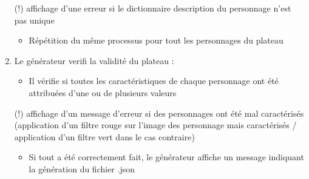 \documentclass[a4paper]{article}
\begin{document}
\begin{enumerate}
(!) affichage d'une erreur si le dictionnaire description du personnage n'est pas unique

\begin{itemize}
    \item Répétition du même processus pour tout les personnages du plateau
\end{itemize}

\item Le générateur verifi la validité du plateau :
\begin{itemize}
    \item Il vérifie si toutes les caractéristiques de chaque personnage ont été attribuées d'une ou de plusieurs valeurs 
\end{itemize}

(!) affichage d'un message d'erreur si des personnages ont été mal caractérisés (application d'un filtre rouge sur l'image des personnage mais caractérisés / application d'un filtre vert dans le cas contraire)

  \begin{itemize}
    \item Si tout a été correctement fait, le générateur affiche un message indiquant la génération du fichier .json
\end{itemize}
\end{enumerate}
\end{document}

